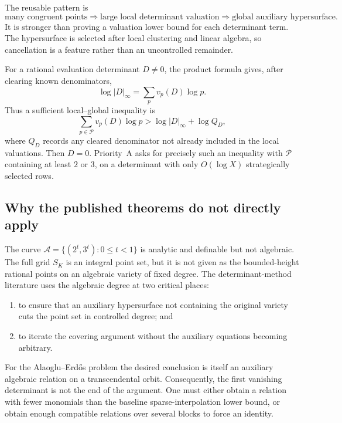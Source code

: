 \documentclass[10pt,letterpaper]{article}
\begin{document}
The reusable pattern is
\[
  \text{many congruent points}
  \Longrightarrow
  \text{large local determinant valuation}
  \Longrightarrow
  \text{global auxiliary hypersurface}.
\]
It is stronger than proving a valuation lower bound for each determinant term.  The
hypersurface is selected after local clustering and linear algebra, so cancellation is a
feature rather than an uncontrolled remainder.

For a rational evaluation determinant \(D\neq0\), the product formula gives, after clearing
known denominators,
\[
  \log|D|_\infty=\sum_p v_p(D)\log p.
\]
Thus a sufficient local--global inequality is
\begin{equation}
  \sum_{p\in\mathcal P}v_p(D)\log p
  > \log|D|_\infty+\log Q_D,
  \label{eq:product-determinant}
\end{equation}
where \(Q_D\) records any cleared denominator not already included in the local valuations.
Then \(D=0\).  Priority~A asks for precisely such an inequality with
\(\mathcal P\) containing at least \(2\) or \(3\), on a determinant with only
\(O(\log X)\) strategically selected rows.

\subsection{Why the published theorems do not directly apply}

The curve \(\mathcal A=\{(2^t,3^t):0\leq t<1\}\) is analytic and definable but not algebraic.
The full grid \(S_K\) is an integral point set, but it is not given as the bounded-height
rational points on an algebraic variety of fixed degree.  The determinant-method literature
uses the algebraic degree at two critical places:

\begin{enumerate}
\item to ensure that an auxiliary hypersurface not containing the original variety cuts the
point set in controlled degree; and
\item to iterate the covering argument without the auxiliary equations becoming arbitrary.
\end{enumerate}

For the Alaoglu--Erd\H{o}s problem the desired conclusion is itself an auxiliary algebraic
relation on a transcendental orbit.  Consequently, the first vanishing determinant is not
the end of the argument.  One must either obtain a relation with fewer monomials than the
baseline sparse-interpolation lower bound, or obtain enough compatible relations over
several blocks to force an identity.
\end{document}
